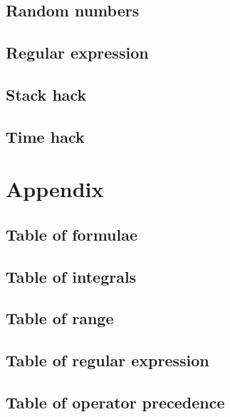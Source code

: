 \documentclass[titlepage,a4paper,10pt]{article}
\begin{document}
\begin{multicols}{2}
\begin{spacing}{0.8}
{			\subsection{Random numbers}
				
			\subsection{Regular expression}
				
			\subsection{Stack hack}
				
			\subsection{Time hack}
				
		\section{Appendix}
			\subsection{Table of formulae}
				
			\subsection{Table of integrals}
				
			\subsection{Table of range}
				
			\subsection{Table of regular expression}
				
			\subsection{Table of operator precedence}
				
		}
		\end{spacing}
		\endgroup
	\end{multicols}
\end{document}
